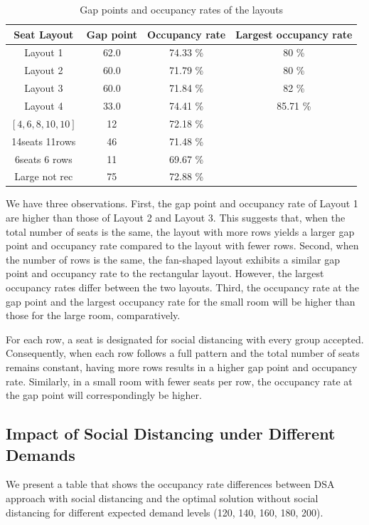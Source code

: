 \begin{table}[ht]
  \centering
  \caption{Gap points and occupancy rates of the layouts}
  \begin{tabular}{|c|c|c|c|}
  \hline
   Seat Layout & Gap point & Occupancy rate & Largest occupancy rate \\
   \hline
   Layout 1 & 62.0 & 74.33 \% & 80 \% \\
   Layout 2 & 60.0 & 71.79 \% & 80 \% \\ 
   Layout 3 & 60.0 & 71.84 \% & 82 \% \\
   Layout 4 & 33.0 & 74.41 \% & 85.71 \% \\
   $[4,6,8,10,10]$ & 12 & 72.18 \% &  \\
   14seats 11rows & 46 & 71.48 \% &  \\
   6seats 6 rows & 11 & 69.67 \% &  \\
   Large not rec & 75 & 72.88 \% &  \\
   \hline
  \end{tabular}
\end{table}

We have three observations. First, the gap point and occupancy rate of Layout 1 are higher than those of Layout 2 and Layout 3. This suggests that, when the total number of seats is the same, the layout with more rows yields a larger gap point and occupancy rate compared to the layout with fewer rows.
Second, when the number of rows is the same, the fan-shaped layout exhibits a similar gap point and occupancy rate to the rectangular layout. However, the largest occupancy rates differ between the two layouts. Third, the occupancy rate at the gap point and the largest occupancy rate for the small room will be higher than those for the large room, comparatively.

For each row, a seat is designated for social distancing with every group accepted. Consequently, when each row follows a full pattern and the total number of seats remains constant, having more rows results in a higher gap point and occupancy rate. Similarly, in a small room with fewer seats per row, the occupancy rate at the gap point will correspondingly be higher.

\subsection{Impact of Social Distancing under Different Demands}
We present a table that shows the occupancy rate differences between DSA approach with social distancing and the optimal solution without social distancing for different expected demand levels (120, 140, 160, 180, 200).

